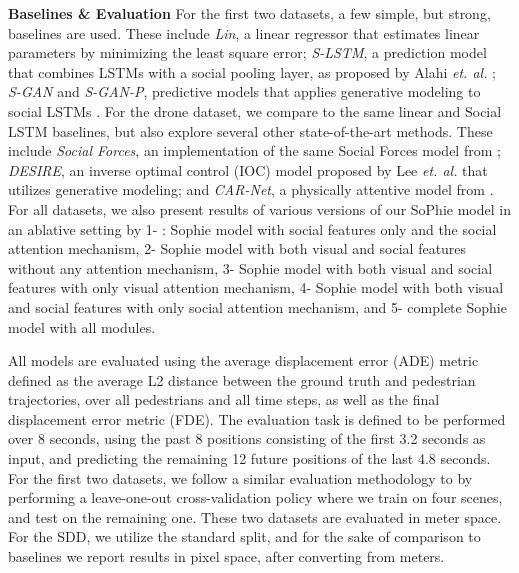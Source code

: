 \documentclass[10pt,twocolumn,letterpaper]{article}
\begin{document}
\textbf{Baselines \& Evaluation} For the first two datasets, a few simple, but strong, baselines are used. These include \textit{Lin}, a linear regressor that estimates linear parameters by minimizing the least square error; \textit{S-LSTM}, a prediction model that combines LSTMs with a social pooling layer, as proposed by Alahi \textit{et. al.} \cite{alahi2016social}; \textit{S-GAN} and \textit{S-GAN-P}, predictive models that applies generative modeling to social LSTMs \cite{gupta2018social}. For the drone dataset, we compare to the same linear and Social LSTM baselines, but also explore several other state-of-the-art methods. These include \textit{Social Forces}, an implementation of the same Social Forces model from \cite{yamaguchi2011you}; \textit{DESIRE}, an inverse optimal control (IOC) model proposed by Lee \textit{et. al.} that utilizes generative modeling; and \textit{CAR-Net}, a physically attentive model from \cite{sadeghian2017car}. 
For all datasets, we also present results of various versions of our SoPhie model in an ablative setting by 
1- : Sophie model with social features only and the social attention mechanism, 2-  Sophie model with both visual and social features without any attention mechanism, 3-  Sophie model with both visual and social features with only visual attention mechanism, 4-  Sophie model with both visual and social features with only social attention mechanism, and 5-  complete Sophie model with all modules. 



All models are evaluated using the average displacement error (ADE) metric defined as the average L2 distance between the ground truth and pedestrian trajectories, over all pedestrians and all time steps, as well as the final displacement error metric (FDE). The evaluation task is defined to be performed over 8 seconds, using the past 8 positions consisting of the first 3.2 seconds as input, and predicting the remaining 12 future positions of the last 4.8 seconds. For the first two datasets, we follow a similar evaluation methodology to \cite{gupta2018social} by performing a leave-one-out cross-validation policy where we train on four scenes, and test on the remaining one. These two datasets are evaluated in meter space. For the SDD, we utilize the standard split, and for the sake of comparison to baselines we report results in pixel space, after converting from meters.
\end{document}
